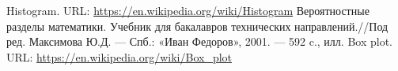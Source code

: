 \documentclass[main.tex]{subfiles}
\begin{document}
	\begin{thebibliography}{99}
		  Histogram. URL: \url{https://en.wikipedia.org/wiki/Histogram}
		  Вероятностные разделы математики. Учебник для бакалавров технических направлений.//Под ред. Максимова Ю.Д. — Спб.: «Иван Федоров», 2001. — 592 c., илл.
		  Box plot. URL: \url{https://en.wikipedia.org/wiki/Box_plot}
	\end{thebibliography}
\end{document}
